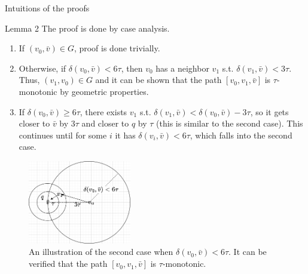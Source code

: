 \documentclass[12pt]{beamer}
\begin{document}
\begin{frame}[allowframebreaks]{Intuitions of the proofs}
  \begin{block}{Lemma 2}
    \small
    The proof is done by case analysis. 
    \begin{enumerate}
      \item If $(v_0, \bar{v}) \in G$, proof is done trivially. 
      \item Otherwise, if $\delta(v_0, \bar{v}) < 6\tau$, then $v_0$ has a neighbor $v_1$ s.t. $\delta(v_1, \bar{v}) < 3\tau$. Thus, $(v_1, v_0) \in G$ and it can be shown that the path $[v_0, v_1, \bar{v}]$ is $\tau$-monotonic by geometric properties.
      \item If $\delta(v_0, \bar{v}) \geq 6\tau$, there exists $v_1$ s.t. $\delta(v_1, \bar{v}) < \delta(v_0, \bar{v}) - 3\tau$, so it gets closer to $\bar{v}$ by $3\tau$ and closer to $q$ by $\tau$ (this is similar to the second case). This continues until for some $i$ it has $\delta(v_i, \bar{v}) < 6\tau$, which falls into the second case.
    \end{enumerate}
  \end{block}
  \begin{figure}
      \includegraphics[width=0.4\textwidth]{lemma2.png}
      \caption{An illustration of the second case when $\delta(v_0, \bar{v}) < 6\tau$. It can be verified that the path $[v_0, v_1, \bar{v}]$ is $\tau$-monotonic.}
  \end{figure}
\end{frame}
\end{document}
